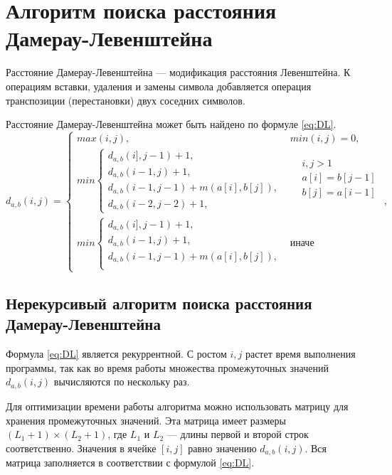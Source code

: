 \section{Алгоритм поиска расстояния Дамерау-Левенштейна}

Расстояние Дамерау-Левенштейна \cite{DamLev} --- модификация расстояния Левенштейна. К операциям вставки, удаления и замены символа добавляется операция транспозиции (перестановки) двух соседних символов.

Расстояние Дамерау-Левенштейна может быть найдено по формуле \ref{eq:DL}.
\begin{equation}
	\label{eq:DL}
	d_{a,b}(i, j) = 
	\begin{cases}
		max(i, j), &  min(i, j) = 0,\\
		min \begin{cases}
			d_{a,b}(i], j - 1) + 1,\\
			d_{a,b}(i - 1, j) + 1,\\
			d_{a,b}(i - 1, j - 1) +  m(a[i], b[j]), \\
			d_{a,b}(i - 2, j - 2) +  1,
		\end{cases} & 
		\begin{split}
		& i, j > 1 \\ 
		& a[i] = b[j-1] \\
		& b[j] = a[i-1] \\
		\end{split}  \\
		min \begin{cases} 
			d_{a,b}(i], j - 1) + 1,\\
			d_{a,b}(i - 1, j) + 1,\\
			d_{a,b}(i - 1, j - 1) +  m(a[i], b[j]), \\
		\end{cases} & \text{иначе}
	\end{cases},
\end{equation}

\subsection{Нерекурсивый алгоритм поиска расстояния Дамерау-Левенштейна}

Формула \ref{eq:DL} является рекуррентной. С ростом $i, j$ растет время выполнения программы, так как во время работы множества промежуточных значений $d_{a,b}(i,j)$ вычисляются по нескольку раз.

Для оптимизации времени работы алгоритма можно использовать матрицу для хранения промежуточных значений. Эта матрица имеет размеры $(L_1 + 1) \times (L_2 + 1)$, где $L_1$ и $L_2$ --- длины первой и второй строк соответственно. Значения в ячейке $[i, j]$ равно значению $d_{a,b}(i, j)$. Вся матрица заполняется в соответствии с формулой \ref{eq:DL}.

